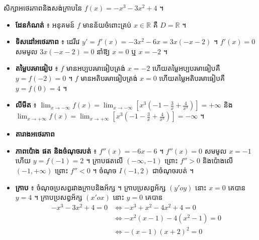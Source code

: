 \begin{example}[ឧទាហរណ៍ ១]
សិក្សាអថេរភាពនិងសង់ក្រាបនៃ $f(x) = -x^3 - 3x^2 + 4$ ។
\end{example}
\begin{itemize}
  \item \textbf{ដែនកំណត់} ៖ អនុគមន៍ $f$ មានន័យចំពោះគ្រប់ $x \in \mathbb{R}$ គឺ $D = \mathbb{R}$ ។
  \item \textbf{ទិសដៅអថេរភាព} ៖ ដេរីវេ $y' = f'(x) = -3x^2 - 6x = 3x(-x - 2)$ ។ $f'(x) = 0$ សមមូល $3x(-x - 2) = 0$ នាំឱ្យ $x = 0$ ឬ $x = -2$ ។
  \begin{center}
  \end{center}
  \item \textbf{តម្លៃបរមាធៀប} ៖ $f$ មានអប្បបរមាធៀបត្រង់ $x = -2$ ហើយតម្លៃអប្បបរមាធៀបគឺ $y = f(-2) = 0$ ។ $f$ មានអតិបរមាធៀបត្រង់ $x = 0$ ហើយតម្លៃអតិបរមាធៀបគឺ $y = f(0) = 4$ ។
  \item \textbf{លីមីត} ៖ $\displaystyle\lim_{x \to -\infty} f(x) = \lim_{x \to -\infty}\left[x^3\left(-1 - \frac{3}{x} + \frac{4}{x^3}\right)\right] = +\infty$ និង $\displaystyle\lim_{x \to +\infty} f(x) = \lim_{x \to +\infty}\left[x^3\left(-1 - \frac{3}{x} + \frac{4}{x^3}\right)\right] = -\infty$ ។
  \item \textbf{តារាងអថេរភាព}
  \begin{center}
  \end{center}
  \item \textbf{ភាពប៉ោង ផត និងចំណុចរបត់} ៖ $f''(x) = -6x - 6$ ។ $f''(x) = 0$ សមមូល $x = -1$ ហើយ $y = f(-1) = 2$ ។ ក្រាបផតលើ $(-\infty, -1)$ ព្រោះ $f'' > 0$ និងប៉ោងលើ $(-1, +\infty)$ ព្រោះ $f'' < 0$ ។ ចំណុច $I(-1, 2)$ ជាចំណុចរបត់ ។
  \item \textbf{ក្រាប} ៖ ចំណុចប្រសព្វរវាងក្រាបនិងអ័ក្ស ។ ក្រាបប្រសព្វអ័ក្ស $(y'oy)$ នោះ $x = 0$ គេបាន $y = 4$ ។ ក្រាបប្រសព្វអ័ក្ស $(x'ox)$ នោះ $y = 0$ គេបាន
  \[ \begin{aligned} -x^3 - 3x^2 + 4 = 0 &\Leftrightarrow -x^3 + x^2 - 4x^2 + 4 = 0\\ &\Leftrightarrow -x^2(x - 1) - 4(x^2 - 1) = 0\\ &\Leftrightarrow -(x - 1)(x + 2)^2 = 0 \end{aligned} \]

\end{itemize}
